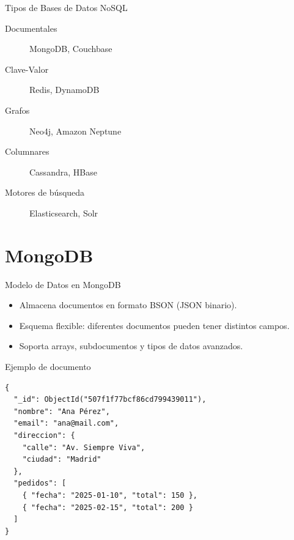 \documentclass[aspectratio=169, 10pt, xcolor=table]{beamer}
\begin{document}
\begin{frame}{Tipos de Bases de Datos NoSQL}
    \begin{description}
        \item[Documentales] MongoDB, Couchbase
        \item[Clave-Valor] Redis, DynamoDB
        \item[Grafos] Neo4j, Amazon Neptune
        \item[Columnares] Cassandra, HBase
        \item[Motores de búsqueda] Elasticsearch, Solr
    \end{description}
\end{frame}

\section{MongoDB}

\begin{frame}[fragile]{Modelo de Datos en MongoDB}
    \begin{itemize}
        \item Almacena documentos en formato BSON (JSON binario).
        \item Esquema flexible: diferentes documentos pueden tener distintos campos.
        \item Soporta arrays, subdocumentos y tipos de datos avanzados.
    \end{itemize}
    \begin{exampleblock}{Ejemplo de documento}
        \begin{verbatim}
{
  "_id": ObjectId("507f1f77bcf86cd799439011"),
  "nombre": "Ana Pérez",
  "email": "ana@mail.com",
  "direccion": {
    "calle": "Av. Siempre Viva",
    "ciudad": "Madrid"
  },
  "pedidos": [
    { "fecha": "2025-01-10", "total": 150 },
    { "fecha": "2025-02-15", "total": 200 }
  ]
}
        \end{verbatim}
    \end{exampleblock}
\end{frame}
\end{document}
